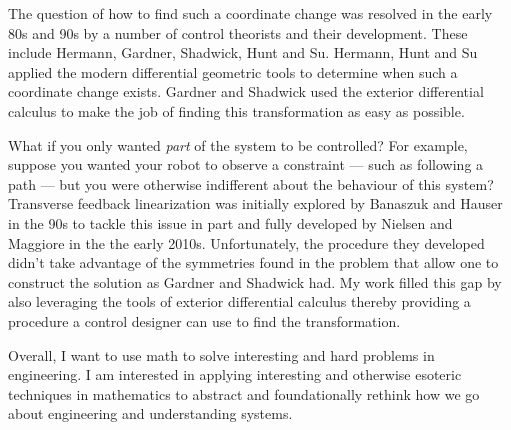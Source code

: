 The question of how to find such a coordinate change was resolved in the early 80s and 90s by a number of control theorists and their development.
These include Hermann, Gardner, Shadwick, Hunt and Su.
Hermann, Hunt and Su applied the modern differential geometric tools to determine when such a coordinate change exists.
Gardner and Shadwick used the exterior differential calculus to make the job of finding this transformation as easy as possible.

What if you only wanted \emph{part} of the system to be controlled?
For example, suppose you wanted your robot to observe a constraint --- such as following a path --- but you were otherwise indifferent about the behaviour of this system?
Transverse feedback linearization was initially explored by Banaszuk and Hauser in the 90s to tackle this issue in part and fully developed by Nielsen and Maggiore in the the early 2010s.
Unfortunately, the procedure they developed didn't take advantage of the symmetries found in the problem that allow one to construct the solution as Gardner and Shadwick had.
My work filled this gap by also leveraging the tools of exterior differential calculus thereby providing a procedure a control designer can use to find the transformation.

Overall, I want to use math to solve interesting and hard problems in engineering.
I am interested in applying interesting and otherwise esoteric techniques in mathematics to abstract and foundationally rethink how we go about engineering and understanding systems.
